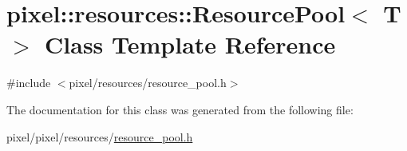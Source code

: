 \hypertarget{classpixel_1_1resources_1_1_resource_pool}{}\section{pixel\+:\+:resources\+:\+:Resource\+Pool$<$ T $>$ Class Template Reference}
\label{classpixel_1_1resources_1_1_resource_pool}


{\ttfamily \#include $<$pixel/resources/resource\+\_\+pool.\+h$>$}



The documentation for this class was generated from the following file\+:\begin{DoxyCompactItemize}
\item 
pixel/pixel/resources/\hyperlink{resource__pool_8h}{resource\+\_\+pool.\+h}\end{DoxyCompactItemize}
